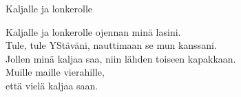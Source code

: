 \begin{song}{Kaljalle ja lonkerolle}


    Kaljalle ja lonkerolle ojennan minä lasini.\\
    Tule, tule YStäväni, nauttimaan se mun kanssani.\\
    Jollen minä kaljaa saa, niin lähden toiseen kapakkaan.\\
    Muille maille vierahille,\\
    että vielä kaljaa saan.

\end{song}